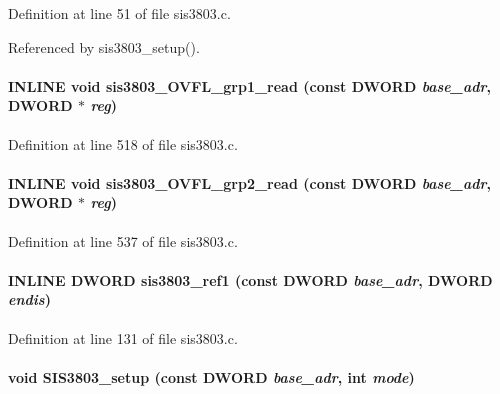 Definition at line 51 of file sis3803.c.

Referenced by sis3803\_\-setup().
\paragraph[{sis3803\_\-OVFL\_\-grp1\_\-read}]{\setlength{\rightskip}{0pt plus 5cm}INLINE void sis3803\_\-OVFL\_\-grp1\_\-read (const {\bf DWORD} {\em base\_\-adr}, \/  {\bf DWORD} $\ast$ {\em reg})}\hfill\label{sis3803_8c_abf3cbd8201df2847a80e715f403a765e}


Definition at line 518 of file sis3803.c.
\paragraph[{sis3803\_\-OVFL\_\-grp2\_\-read}]{\setlength{\rightskip}{0pt plus 5cm}INLINE void sis3803\_\-OVFL\_\-grp2\_\-read (const {\bf DWORD} {\em base\_\-adr}, \/  {\bf DWORD} $\ast$ {\em reg})}\hfill\label{sis3803_8c_a6c450c1e0bece5f0b17fbe17b45988c1}


Definition at line 537 of file sis3803.c.
\paragraph[{sis3803\_\-ref1}]{\setlength{\rightskip}{0pt plus 5cm}INLINE {\bf DWORD} sis3803\_\-ref1 (const {\bf DWORD} {\em base\_\-adr}, \/  {\bf DWORD} {\em endis})}\hfill\label{sis3803_8c_a61261462dc52f7eb12bbb910b6585c4f}


Definition at line 131 of file sis3803.c.
\paragraph[{SIS3803\_\-setup}]{\setlength{\rightskip}{0pt plus 5cm}void SIS3803\_\-setup (const {\bf DWORD} {\em base\_\-adr}, \/  int {\em mode})}\hfill\label{sis3803_8c_a994abee2e8eaa3cf9d647e566e07d620}


